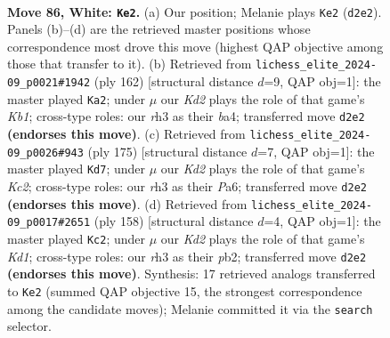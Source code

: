 \documentclass[11pt]{article}
\begin{document}
\clearpage

\begin{figure}[p]\centering
\begin{subfigure}{0.46\textwidth}\centering
\resizebox{\linewidth}{!}{%
\newchessgame
\chessboard[
  setfen={8/8/8/2p2k2/p2p4/7r/3K4/8 w - - 12 86},
  showmover=false,
  pgfstyle=straightmove, color=movearrow, markmove={d2-e2}
]}
\caption{}
\end{subfigure}\hfill
\begin{subfigure}{0.46\textwidth}\centering
\resizebox{\linewidth}{!}{%
\newchessgame
\chessboard[
  setfen={8/8/8/2k5/b2p4/2p5/8/1K6 w - - 4 82},
  showmover=false,
  pgfstyle=straightmove, color=movearrow, markmove={b1-a2}
]}
\caption{}
\end{subfigure}
\\[4pt]
\begin{subfigure}{0.46\textwidth}\centering
\resizebox{\linewidth}{!}{%
\newchessgame
\chessboard[
  setfen={8/2k5/p7/P2K4/1P6/8/8/8 b - - 14 88},
  showmover=false,
  pgfstyle=straightmove, color=movearrow, markmove={c7-d7}
]}
\caption{}
\end{subfigure}\hfill
\begin{subfigure}{0.46\textwidth}\centering
\resizebox{\linewidth}{!}{%
\newchessgame
\chessboard[
  setfen={8/8/8/3k2p1/5pP1/8/1p6/3K4 w - - 0 80},
  showmover=false,
  pgfstyle=straightmove, color=movearrow, markmove={d1-c2}
]}
\caption{}
\end{subfigure}
\caption{\textbf{Move 86, White: \texttt{Ke2}.} (a) Our position; Melanie plays \texttt{Ke2} (\texttt{d2e2}). Panels (b)--(d) are the retrieved master positions whose correspondence most drove this move (highest QAP objective among those that transfer to it). (b) Retrieved from \texttt{lichess\_elite\_2024-09\_p0021\#1942} (ply 162) [structural distance $d$=9, QAP obj=1]: the master played \texttt{Ka2}; under $\mu$ our \emph{Kd2} plays the role of that game's \emph{Kb1}; cross-type roles: our \emph{r}h3 as their \emph{b}a4; transferred move \texttt{d2e2} \textbf{(endorses this move)}. (c) Retrieved from \texttt{lichess\_elite\_2024-09\_p0026\#943} (ply 175) [structural distance $d$=7, QAP obj=1]: the master played \texttt{Kd7}; under $\mu$ our \emph{Kd2} plays the role of that game's \emph{Kc2}; cross-type roles: our \emph{r}h3 as their \emph{P}a6; transferred move \texttt{d2e2} \textbf{(endorses this move)}. (d) Retrieved from \texttt{lichess\_elite\_2024-09\_p0017\#2651} (ply 158) [structural distance $d$=4, QAP obj=1]: the master played \texttt{Kc2}; under $\mu$ our \emph{Kd2} plays the role of that game's \emph{Kd1}; cross-type roles: our \emph{r}h3 as their \emph{p}b2; transferred move \texttt{d2e2} \textbf{(endorses this move)}. Synthesis: 17 retrieved analogs transferred to \texttt{Ke2} (summed QAP objective 15, the strongest correspondence among the candidate moves); Melanie committed it via the \texttt{search} selector.}
\label{fig:thought-m170}
\end{figure}
\end{document}
